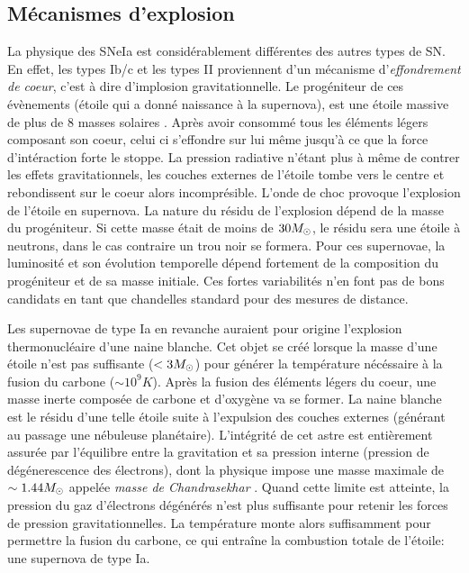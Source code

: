 \documentclass[../main/main.tex]{subfiles}
\begin{document}
\subsection{Mécanismes d'explosion}
La physique des SNeIa est considérablement différentes des autres types
de SN. En effet, les types Ib/c et les types II proviennent d'un
mécanisme d'\textit{effondrement de coeur}, c'est à dire d'implosion
gravitationnelle. Le progéniteur de ces évènements (étoile qui a donné
naissance à la supernova), est une étoile massive de plus de $8$ masses solaires
\citep{Heger2003}. Après avoir consommé tous les éléments légers
composant son coeur, celui ci s'effondre sur lui même jusqu'à ce que la
force d'intéraction forte le stoppe. La pression radiative n'étant plus
à même de contrer les effets gravitationnels, les couches externes de
l'étoile tombe vers le centre et rebondissent sur le coeur alors
incomprésible. L'onde de choc provoque l'explosion de l'étoile en
supernova.
La nature du résidu de l'explosion dépend de la masse du progéniteur. Si
cette masse était de moins de $30M_{\odot}$, le résidu sera une étoile à
neutrons, dans le cas contraire un trou noir se formera.
Pour ces supernovae, la luminosité et son évolution temporelle dépend
fortement de la composition du progéniteur et de sa masse
initiale. Ces fortes variabilités n'en font pas de bons candidats en
tant que chandelles standard pour des mesures de distance.

Les supernovae de type Ia en revanche auraient pour origine l'explosion
thermonucléaire d'une naine blanche. Cet objet se créé lorsque la masse d'une étoile n'est pas
suffisante ($<3M_{\odot}$) pour générer la température nécéssaire à la
fusion du carbone ($\sim10^{9}K$). Après la fusion des éléments
légers du coeur, une masse inerte composée de carbone et d'oxygène va se
former. La naine blanche est le résidu d'une telle étoile suite à l'expulsion des couches externes (générant au passage une
nébuleuse planétaire).
L'intégrité de cet astre est entièrement assurée par l'équilibre entre
la gravitation et sa pression interne (pression de dégénerescence des
électrons), dont la physique impose une masse maximale de
$\sim1.44M_{\odot}$ appelée \textit{masse de Chandrasekhar} \citep{Chandrasekhar}.
Quand cette limite est atteinte, la pression du gaz d'électrons
dégénérés n'est plus suffisante pour retenir les forces de pression
gravitationnelles. La température monte alors suffisamment pour
permettre la fusion du carbone, ce qui entraîne la combustion totale de
l'étoile: une supernova de type Ia.
\end{document}
